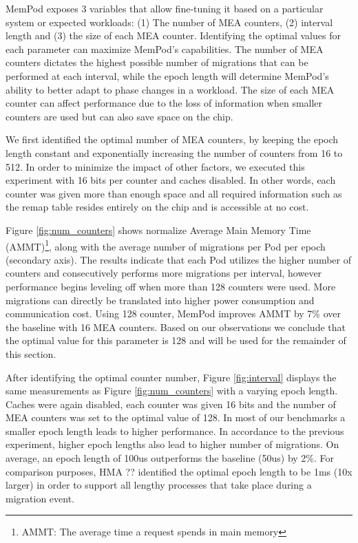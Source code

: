 MemPod exposes 3 variables that allow fine-tuning it based on a particular system or expected workloads: (1) The number of MEA counters, (2) interval length and (3) the size of each MEA counter. Identifying the optimal values for each parameter can maximize MemPod's capabilities. The number of MEA counters dictates the highest possible number of migrations that can be performed at each interval, while the epoch length will determine MemPod's ability to better adapt to phase changes in a workload. The size of each MEA counter can affect performance due to the loss of information when smaller counters are used but can also save space on the chip.

We first identified the optimal number of MEA counters, by keeping the epoch length constant and exponentially increasing the number of counters from 16 to 512. In order to minimize the impact of other factors, we executed this experiment with 16 bits per counter and caches disabled. In other words, each counter was given more than enough space and all required information such as the remap table resides entirely on the chip and is accessible at no cost. 

Figure \ref{fig:num_counters} shows normalize Average Main Memory Time (AMMT)\footnote{AMMT: The average time a request spends in main memory}, along with the average number of migrations per Pod per epoch (secondary axis). The results indicate that each Pod utilizes the higher number of counters and consecutively performs more migrations per interval, however performance begins leveling off when more than 128 counters were used. More migrations can directly be translated into higher power consumption and communication cost. Using 128 counter, MemPod improves AMMT by 7\% over the baseline with 16 MEA counters. Based on our observations we conclude that the optimal value for this parameter is 128 and will be used for the remainder of this section.

After identifying the optimal counter number, Figure \ref{fig:interval} displays the same measurements as Figure \ref{fig:num_counters} with a varying epoch length. Caches were again disabled, each counter was given 16 bits and the number of MEA counters was set to the optimal value of 128. In most of our benchmarks a smaller epoch length leads to higher performance. In accordance to the previous experiment, higher epoch lengths also lead to higher number of migrations. On average, an epoch length of 100us outperforms the baseline (50us) by 2\%. For comparison purposes, HMA ?? identified the optimal epoch length to be 1ms (10x larger) in order to support all lengthy processes that take place during a migration event.

